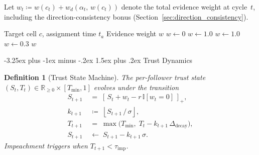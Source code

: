 \documentclass[conference]{IEEEtran}
\makeatletter
\newtheorem{definition}{Definition}
\newcommand{\Ind}{\mathbb{I}}
\newcommand{\clip}[1]{\left[#1\right]_+}
\newcommand{\defeq}{\coloneqq}
\renewcommand{\subsection}{\@startsection{subsection}{2}{\z@}%
  {-3.25ex plus -1ex minus -.2ex}%
  {1.5ex plus .2ex}%
  {\normalfont\normalsize\itshape\centering}}
\makeatother
\begin{document}
Let $w_t \defeq w(c_t) + w_d(\alpha_t,\, w(c_t))$ denote the total evidence weight at cycle~$t$, including the direction-consistency bonus (Section~\ref{sec:direction_consistency}).

\begin{algorithm}[h]
\caption{Three-Tier Evidence Weighting}
\label{alg:evidence}
\begin{algorithmic}[1]
\REQUIRE Target cell $c$, assignment time $t_a$
\ENSURE Evidence weight $w$
\STATE $w \leftarrow 0$
    \STATE $w \leftarrow 1.0$
    \STATE $w \leftarrow 1.0$
    \STATE $w \leftarrow 0.3$
\ENDIF
\RETURN $w$
\end{algorithmic}
\end{algorithm}

\subsection{Trust Dynamics}
\label{sec:trust_dynamics}

\begin{definition}[Trust State Machine]
\label{def:trust_sm}
The per-follower trust state $(S_t, T_t)\in\mathbb{R}_{\geq 0}\times[T_{\min},1]$ evolves under the transition
\begin{align}
S_{t+1} &\;=\; \clip{\,S_t + w_t - r\,\Ind[w_t=0]\,},
\label{eq:suspicion_compact}\\
k_{t+1} &\;\defeq\; \left\lfloor S_{t+1}\,/\,\sigma \right\rfloor,
\label{eq:crossings}\\
T_{t+1} &\;=\; \max\!\bigl(T_{\min},\;
         T_t - k_{t+1}\,\Delta_{\text{decay}}\bigr),
\label{eq:trust_compact}\\
S_{t+1} &\;\leftarrow\; S_{t+1} - k_{t+1}\,\sigma.
\label{eq:residual}
\end{align}
Impeachment triggers when $T_{t+1} < \tau_{\text{imp}}$.
\end{definition}
\end{document}
